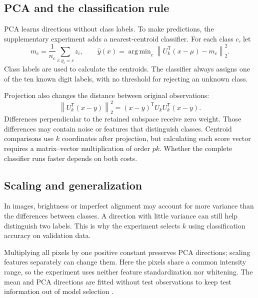 \documentclass[11pt,a4paper,english]{article}
\numberwithin{equation}{section}
\DeclareMathOperator*{\argmin}{arg\,min}
\newcommand{\norm}[1]{\left\lVert#1\right\rVert}
\newcommand{\T}{^{\mathsf T}}
\begin{document}
\subsection{PCA and the classification rule}
PCA learns directions without class labels. To make predictions, the supplementary experiment adds a nearest-centroid classifier. For each class $c$, let
\begin{equation}
m_c=\frac1{n_c}\sum_{i:y_i=c}z_i,
\qquad \hat y(x)=\argmin_c\norm{U_k\T(x-\mu)-m_c}_2^2.
\label{eq:classifier}
\end{equation}
Class labels are used to calculate the centroids. The classifier always assigns one of the ten known digit labels, with no threshold for rejecting an unknown class.

Projection also changes the distance between original observations:
\begin{equation}
\norm{U_k\T(x-y)}_2^2=(x-y)\T U_kU_k\T(x-y).
\label{eq:distance}
\end{equation}
Differences perpendicular to the retained subspace receive zero weight. Those differences may contain noise or features that distinguish classes. Centroid comparisons use $k$ coordinates after projection, but calculating each score vector requires a matrix--vector multiplication of order $pk$. Whether the complete classifier runs faster depends on both costs.

\subsection{Scaling and generalization}
In images, brightness or imperfect alignment may account for more variance than the differences between classes. A direction with little variance can still help distinguish two labels. This is why the experiment selects $k$ using classification accuracy on validation data.

Multiplying all pixels by one positive constant preserves PCA directions; scaling features separately can change them. Here the pixels share a common intensity range, so the experiment uses neither feature standardization nor whitening. The mean and PCA directions are fitted without test observations to keep test information out of model selection \cite{leakage}.
\end{document}
